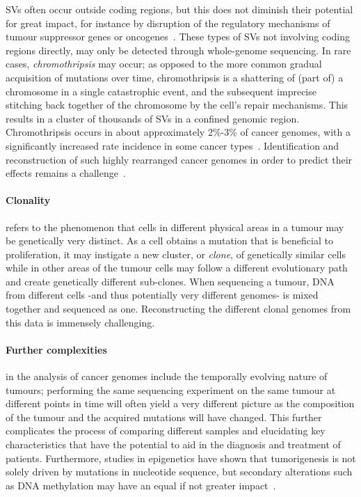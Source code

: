 \begin{justify}
SVs often occur outside coding regions, but this does not diminish their potential for great impact, for instance by disruption of the regulatory mechanisms of tumour suppressor genes or oncogenes~\cite{TODO}. These types of SVs not involving coding regions directly, may only be detected through whole-genome sequencing. In rare cases, \emph{chromothripsis} may occur; as opposed to the more common gradual acquisition of mutations over time, chromothripsis is a shattering of (part of) a chromosome in a single catastrophic event, and the subsequent imprecise stitching back together of the chromosome by the cell's repair mechanisms. This results in a cluster of thousands of SVs in a confined genomic region. Chromothripsis occurs in about approximately 2\%-3\% of cancer genomes, with a significantly increased rate incidence in some cancer types~\cite{luijten2018}. Identification and reconstruction of such highly rearranged cancer genomes in order to predict their effects remains a challenge~\cite{yang2016chromothripsis,govind2014}.




\paragraph{Clonality} refers to the phenomenon that cells in different physical areas in a tumour may be genetically very distinct. As a cell obtains a mutation that is beneficial to proliferation, it may instigate a new cluster, or \textit{clone}, of genetically similar cells while in other areas of the tumour cells may follow a different evolutionary path and create genetically different sub-clones. When sequencing a tumour, DNA from different cells -and thus potentially very different genomes- is mixed together and sequenced as one. Reconstructing the different clonal genomes from this data is immensely challenging.

\paragraph{Further complexities} in the analysis of cancer genomes include the temporally evolving nature of tumours; performing the same sequencing experiment on the same tumour at different points in time will often yield a very different picture as the composition of the tumour and the acquired mutations will have changed. This further complicates the process of comparing different samples and elucidating key characteristics that have the potential to aid in the diagnosis and treatment of patients. Furthermore, studies in epigenetics have shown that tumorigenesis is not solely driven by mutations in nucleotide sequence, but secondary alterations such as DNA methylation may have an equal if not greater impact~\cite{pacchierotti2015environmental}.


\end{justify}
